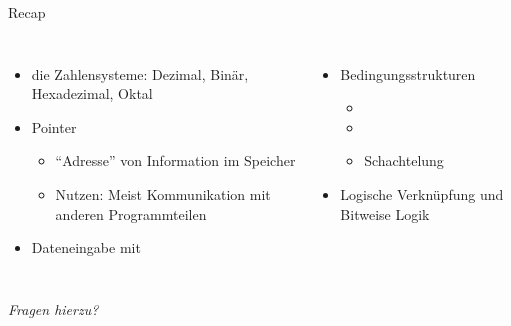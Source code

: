 
\begin{frame}{Recap}
%
\begin{columns}[T]
\begin{itemize}
\item die Zahlensysteme: Dezimal, Binär, Hexadezimal, Oktal
\item Pointer
	\begin{itemize}
	\item \enquote{Adresse} von Information im Speicher
	\item Nutzen: Meist Kommunikation mit anderen Programmteilen
	\end{itemize}
\item Dateneingabe mit 
\end{itemize}
%
\begin{itemize}
\item Bedingungsstrukturen
	\begin{itemize}
	\item {}
	\item {}
	\item Schachtelung
	\end{itemize}
\item Logische Verknüpfung und Bitweise Logik
\end{itemize}
\end{columns}
%
\begin{center}
\emph{Fragen hierzu?}
\end{center}
%
\end{frame}


